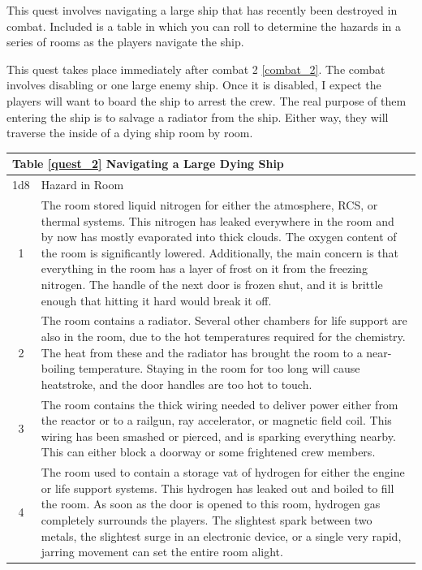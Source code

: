 \documentclass[a4paper]{article}
\begin{document}
This quest involves navigating a large ship that has recently been destroyed in combat. Included is a table in which you can roll to determine the hazards in a series of rooms as the players navigate the ship. 

This quest takes place immediately after combat 2 \ref{combat_2}. The combat involves disabling or one large enemy ship. Once it is disabled, I expect the players will want to board the ship to arrest the crew. The real purpose of them entering the ship is to salvage a radiator from the ship. Either way, they will traverse the inside of a dying ship room by room.

\begin{tabular}[t]{| c | p{12.5cm} |}
\toprule
\multicolumn{2}{|l|}{Table \ref{quest_2} Navigating a Large Dying Ship} \\
\midrule
1d8 & Hazard in Room \\
\midrule
1 & The room stored liquid nitrogen for either the atmosphere, RCS, or thermal systems. This nitrogen has leaked everywhere in the room and by now has mostly evaporated into thick clouds. The oxygen content of the room is significantly lowered. Additionally, the main concern is that everything in the room has a layer of frost on it from the freezing nitrogen. The handle of the next door is frozen shut, and it is brittle enough that hitting it hard would break it off. \\
2 & The room contains a radiator. Several other chambers for life support are also in the room, due to the hot temperatures required for the chemistry. The heat from these and the radiator has brought the room to a near-boiling temperature. Staying in the room for too long will cause heatstroke, and the door handles are too hot to touch. \\
3 & The room contains the thick wiring needed to deliver power either from the reactor or to a railgun, ray accelerator, or magnetic field coil. This wiring has been smashed or pierced, and is sparking everything nearby. This can either block a doorway or some frightened crew members. \\
4 & The room used to contain a storage vat of hydrogen for either the engine or life support systems. This hydrogen has leaked out and boiled to fill the room. As soon as the door is opened to this room, hydrogen gas completely surrounds the players. The slightest spark between two metals, the slightest surge in an electronic device, or a single very rapid, jarring movement can set the entire room alight. \\

\end{tabular}
\end{document}
